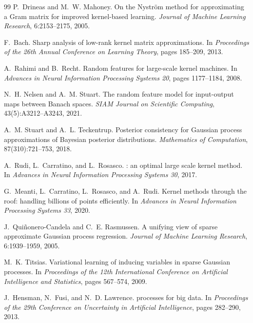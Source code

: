 \begin{thebibliography}{99}
P.~Drineas and M.~W. Mahoney.
\newblock On the {Nystr\"om} method for approximating a {Gram} matrix for improved
kernel-based learning.
\newblock \emph{Journal of Machine Learning Research}, 6:2153--2175, 2005.

F.~Bach.
\newblock Sharp analysis of low-rank kernel matrix approximations.
\newblock In \emph{Proceedings of the 26th Annual Conference on Learning Theory}, pages
185--209, 2013.

A.~Rahimi and B.~Recht.
\newblock Random features for large-scale kernel machines.
\newblock In \emph{Advances in Neural Information Processing Systems 20}, pages 1177--1184,
2008.

N.~H. Nelsen and A.~M. Stuart.
\newblock The random feature model for input-output maps between {Banach} spaces.
\newblock \emph{SIAM Journal on Scientific Computing}, 43(5):A3212--A3243, 2021.

A.~M. Stuart and A.~L. Teckentrup.
\newblock Posterior consistency for {Gaussian} process approximations of {Bayesian} posterior
distributions.
\newblock \emph{Mathematics of Computation}, 87(310):721--753, 2018.

A.~Rudi, L.~Carratino, and L.~Rosasco.
: an optimal large scale kernel method.
\newblock In \emph{Advances in Neural Information Processing Systems 30}, 2017.

G.~Meanti, L.~Carratino, L.~Rosasco, and A.~Rudi.
\newblock Kernel methods through the roof: handling billions of points efficiently.
\newblock In \emph{Advances in Neural Information Processing Systems 33}, 2020.

J.~Qui\~nonero-Candela and C.~E. Rasmussen.
\newblock A unifying view of sparse approximate {Gaussian} process regression.
\newblock \emph{Journal of Machine Learning Research}, 6:1939--1959, 2005.

M.~K. Titsias.
\newblock Variational learning of inducing variables in sparse {Gaussian} processes.
\newblock In \emph{Proceedings of the 12th International Conference on Artificial Intelligence
and Statistics}, pages 567--574, 2009.

J.~Hensman, N.~Fusi, and N.~D. Lawrence.
 processes for big data.
\newblock In \emph{Proceedings of the 29th Conference on Uncertainty in Artificial
Intelligence}, pages 282--290, 2013.


\end{thebibliography}
